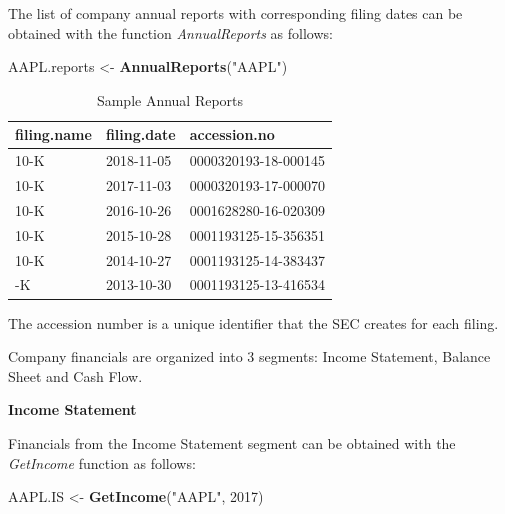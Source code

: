 \documentclass[]{book}
\newenvironment{Shaded}{\begin{snugshade}}{\end{snugshade}}
\newcommand{\KeywordTok}[1]{\textcolor[rgb]{0.13,0.29,0.53}{\textbf{#1}}}
\newcommand{\DecValTok}[1]{\textcolor[rgb]{0.00,0.00,0.81}{#1}}
\newcommand{\StringTok}[1]{\textcolor[rgb]{0.31,0.60,0.02}{#1}}
\newcommand{\NormalTok}[1]{#1}
\theoremstyle{definition}
\theoremstyle{definition}
\theoremstyle{definition}
\theoremstyle{remark}
\begin{document}
The list of company annual reports with corresponding filing dates can
be obtained with the function \emph{AnnualReports} as follows:

\begin{Shaded}
\begin{Highlighting}[]
\NormalTok{AAPL.reports <-}\StringTok{ }\KeywordTok{AnnualReports}\NormalTok{(}\StringTok{"AAPL"}\NormalTok{)}
\end{Highlighting}
\end{Shaded}

\begin{table}[t]

\caption{\label{tab:unnamed-chunk-23}Sample Annual Reports}
\centering
\begin{tabular}{lll}
\toprule
filing.name & filing.date & accession.no\\
\midrule
10-K & 2018-11-05 & 0000320193-18-000145\\
10-K & 2017-11-03 & 0000320193-17-000070\\
10-K & 2016-10-26 & 0001628280-16-020309\\
10-K & 2015-10-28 & 0001193125-15-356351\\
10-K & 2014-10-27 & 0001193125-14-383437\\
\addlinespace
10-K & 2013-10-30 & 0001193125-13-416534\\
\bottomrule
\end{tabular}
\end{table}

The accession number is a unique identifier that the SEC creates for
each filing.

Company financials are organized into 3 segments: Income Statement,
Balance Sheet and Cash Flow.

\textbf{Income Statement}

Financials from the Income Statement segment can be obtained with the
\emph{GetIncome} function as follows:

\begin{Shaded}
\begin{Highlighting}[]
\NormalTok{AAPL.IS <-}\StringTok{ }\KeywordTok{GetIncome}\NormalTok{(}\StringTok{"AAPL"}\NormalTok{, }\DecValTok{2017}\NormalTok{)}
\end{Highlighting}
\end{Shaded}
\end{document}
